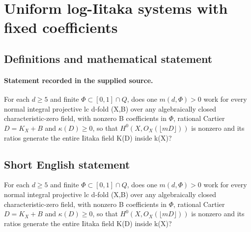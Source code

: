 \documentclass[11pt]{article}
\begin{document}
\section*{Uniform log-Iitaka systems with fixed coefficients}\label{statement}
\subsection{Definitions and mathematical statement}
\paragraph{Statement recorded in the supplied source.}
For each $d\geq 5$ and finite $\Phi \subset [0,1]\cap Q$, does one $m(d,\Phi )>0$ work for every normal integral projective lc d-fold (X,B) over any algebraically closed characteristic-zero field, with nonzero B coefficients in $\Phi $, rational Cartier $D=K_X+B$ and $\kappa (D)\geq 0$, so that $H^{0}(X,O_X(\lfloor mD\rfloor ))$ is nonzero and its ratios generate the entire Iitaka field K(D) inside k(X)?
\subsection{Short English statement}
For each $d\geq 5$ and finite $\Phi \subset [0,1]\cap Q$, does one $m(d,\Phi )>0$ work for every normal integral projective lc d-fold (X,B) over any algebraically closed characteristic-zero field, with nonzero B coefficients in $\Phi $, rational Cartier $D=K_X+B$ and $\kappa (D)\geq 0$, so that $H^{0}(X,O_X(\lfloor mD\rfloor ))$ is nonzero and its ratios generate the entire Iitaka field K(D) inside k(X)?
\end{document}
